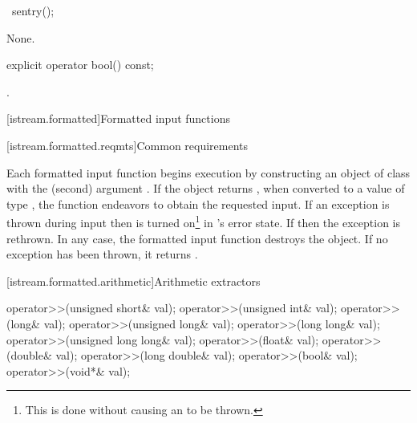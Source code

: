 %
%
\begin{itemdecl}
~sentry();
\end{itemdecl}

\begin{itemdescr}
\pnum
\effects
None.
\end{itemdescr}

%
\begin{itemdecl}
explicit operator bool() const;
\end{itemdecl}

\begin{itemdescr}
\pnum
\returns
{}.
\end{itemdescr}

[istream.formatted]{Formatted input functions}

[istream.formatted.reqmts]{Common requirements}

\pnum
Each formatted input function begins execution by constructing an object of class
with the
(second) argument
.
If the
object returns
,
when converted to a value of type
,
the function endeavors
to obtain the requested input.
If an exception is thrown during input then
is turned on\footnote{This is done without causing an
to be thrown.}
in
's
error state.
If
then the exception is rethrown.
In any case, the formatted input function destroys the
object.
If no exception has been thrown, it returns
.

[istream.formatted.arithmetic]{Arithmetic extractors}

%
\begin{itemdecl}
operator>>(unsigned short& val);
operator>>(unsigned int& val);
operator>>(long& val);
operator>>(unsigned long& val);
operator>>(long long& val);
operator>>(unsigned long long& val);
operator>>(float& val);
operator>>(double& val);
operator>>(long double& val);
operator>>(bool& val);
operator>>(void*& val);
\end{itemdecl}

